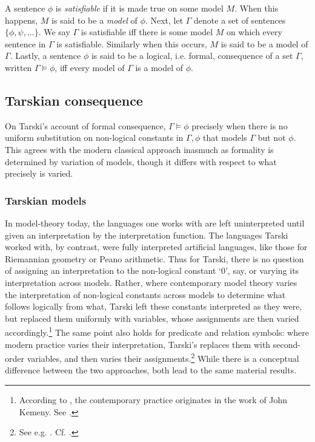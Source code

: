 \documentclass[]{article}
\begin{document}
A sentence $\phi$ is \textit{satisfiable} if it is made true on some model $M$. When this happens, $M$ is said to be a \textit{model} of $\phi$. Next, let $\Gamma$ denote a set of sentences $\{\phi, \psi, ...\}$. We say $\Gamma$ is satisfiable iff there is some model $M$ on which every sentence in $\Gamma$ is satisfiable. Similarly when this occurs, $M$ is said to be a model of $\Gamma$. Lastly, a sentence $\phi$ is said to be a logical, i.e. formal, consequence of a set $\Gamma$, written $\Gamma \models \phi$, iff every model of $\Gamma$ is a model of $\phi$.
\subsection{Tarskian consequence}
On Tarski's account of formal consequence, $\Gamma \models \phi$ precisely when there is no uniform substitution on  non-logical constants in $\Gamma, \phi$ that models $\Gamma$ but not $\phi$. This agrees with the modern classical approach inasmuch as formality is determined by variation of models, though it differs with respect to what precisely is varied.

\subsubsection{Tarskian models}
In model-theory today, the languages one works with are left uninterpreted until given an interpretation by the interpretation function. The languages Tarski worked with, by contrast, were fully interpreted artificial languages, like those for Riemannian geometry or Peano arithmetic. Thus for Tarski, there is no question of assigning an interpretation to the non-logical constant `0', say, or varying its interpretation across models. Rather, where contemporary model theory varies the interpretation of non-logical constants across models to determine what follows logically from what, Tarski left these constants interpreted as they were, but replaced them uniformly with variables, whose assignments are then varied accordingly.\footnote{According to \autocite[433]{Schiemer2013}, the contemporary practice originates in the work of John Kemeny. See \autocite{Kemeny1956} \autocite{Kemeny1956b}.} The same point also holds for predicate and relation symbols: where modern practice varies their interpretation, Tarski's replaces them with second-order variables, and then varies their assignments.\footnote{See e.g. \autocite[122-23]{Tarski1941}. Cf. \autocite[69]{Etchemendy1988} \autocite[448]{Schiemer2013}.} While there is a conceptual difference between the two approaches, both lead to the same material results.
\end{document}
